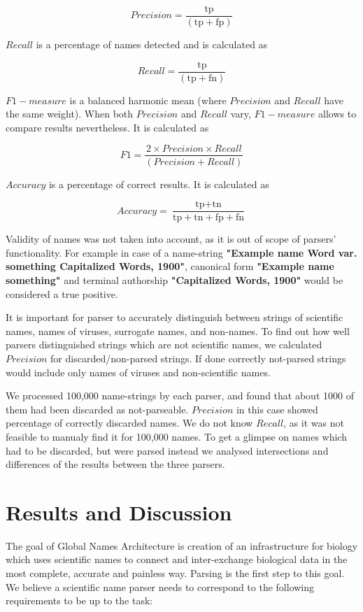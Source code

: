 \documentclass{bmcart}
\begin{document}
\[Precision = \dfrac{\text{tp}}{(\text{tp} + \text{fp})}\]

$Recall$ is a percentage of names detected and is calculated as

\[Recall = \dfrac{\text{tp}}{(\text{tp} + \text{fn})}\]

$F1-measure$ is a balanced harmonic mean (where $Precision$ and $Recall$ have
the same weight). When both $Precision$ and $Recall$ vary, $F1-measure$ allows
to compare results nevertheless. It is calculated as

\[F1 = \dfrac{2 \times Precision \times Recall}{(Precision + Recall)}\]

$Accuracy$ is a percentage of correct results. It is calculated as

\[Accuracy = \dfrac{\text{tp} + \text{tn}}
  {\text{tp} + \text{tn} + \text{fp} + \text{fn}}\]

Validity of names was not taken into account, as it is out of scope of
parsers' functionality. For example in case of a name-string \textbf{"Example
name Word var.  something Capitalized Words, 1900"}, canonical form
\textbf{"Example name something"} and terminal authorship \textbf{"Capitalized
Words, 1900"} would be considered a true positive.

It is important for parser to accurately distinguish between strings of
scientific names, names of viruses, surrogate names, and non-names. To find
out how well parsers distinguished strings which are not scientific names, we
calculated $Precision$ for discarded/non-parsed strings. If done correctly
not-parsed strings would include only names of viruses and non-scientific
names.

We processed 100,000 name-strings by each parser, and found that about 1000 of
them had been discarded as not-parseable. $Precision$ in this case showed
percentage of correctly discarded names.  We do not know $Recall$, as it was
not feasible to manualy find it for 100,000 names. To get a glimpse on names
which had to be discarded, but were parsed instead we analysed intersections
and differences of the results between the three parsers.

\section*{Results and Discussion}

The goal of Global Names Architecture is creation of an infrastructure for
biology which uses scientific names to connect and inter-exchange biological
data in the most complete, accurate and painless way. Parsing is the first
step to this goal. We believe a scientific name parser needs to correspond to
the following requirements to be up to the task:
\end{document}
